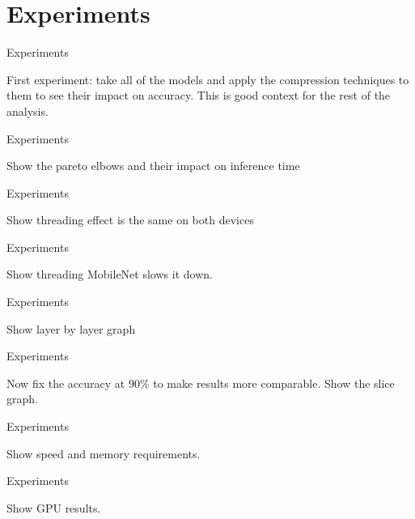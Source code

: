 \documentclass{beamer}
\begin{document}
\section{Experiments}

\begin{frame}{Experiments}

First experiment: take all of the models and apply the compression techniques to them to see their impact on accuracy.
This is good context for the rest of the analysis.
    
\end{frame}











\begin{frame}{Experiments}

Show the pareto elbows and their impact on inference time
    
\end{frame}











\begin{frame}{Experiments}
    
Show threading effect is the same on both devices 
    
\end{frame}







\begin{frame}{Experiments}

Show threading MobileNet slows it down.
    
\end{frame}



\begin{frame}{Experiments}
    
    Show layer by layer graph
    
\end{frame}


\begin{frame}{Experiments}
    
    Now fix the accuracy at 90\% to make results more comparable.
    Show the slice graph.
    
\end{frame}




\begin{frame}{Experiments}
    
    Show speed and memory requirements.
    
\end{frame}



\begin{frame}{Experiments}
    
    Show GPU results.

    
\end{frame}
\end{document}
